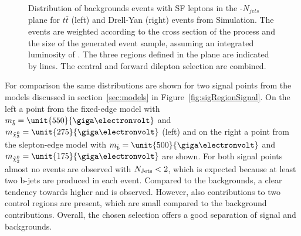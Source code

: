 \begin{figure}[htbp]
\begin{minipage}[t]{0.49\textwidth}
\end{minipage}
\caption{Distribution of backgrounds events with SF leptons in the \MET-$N_{jets}$ plane for $t\bar{t}$ (left) and Drell-Yan (right) events from Simulation. The events are weighted according to the cross section of the process and the size of the generated event sample, assuming an integrated luminosity of \lumi. The three regions defined in the plane are indicated by lines. The central and forward dilepton selection are combined.}
\label{fig:sigRegionBG}
\end{figure}  
  
For comparison the same distributions are shown for two signal points from the models discussed in section~\ref{sec:models} in Figure~\ref{fig:sigRegionSignal}. On the left a point from the fixed-edge model with $m_{\sbottom} = \unit{550}{\giga\electronvolt}$ and $m_{\secondchi} = \unit{275}{\giga\electronvolt}$ (left) and on the right a point from the slepton-edge model with $m_{\sbottom} = \unit{500}{\giga\electronvolt}$ and $m_{\secondchi} = \unit{175}{\giga\electronvolt}$ are shown. For both signal points almost no events are observed with $N_\text{Jets} < 2$, which is expected because at least two b-jets are produced in each event. Compared to the backgrounds, a clear tendency towards higher \MET and \njets is observed. However, also contributions to two control regions are present, which are small compared to the background contributions. Overall, the chosen selection offers a good separation of signal and backgrounds.
